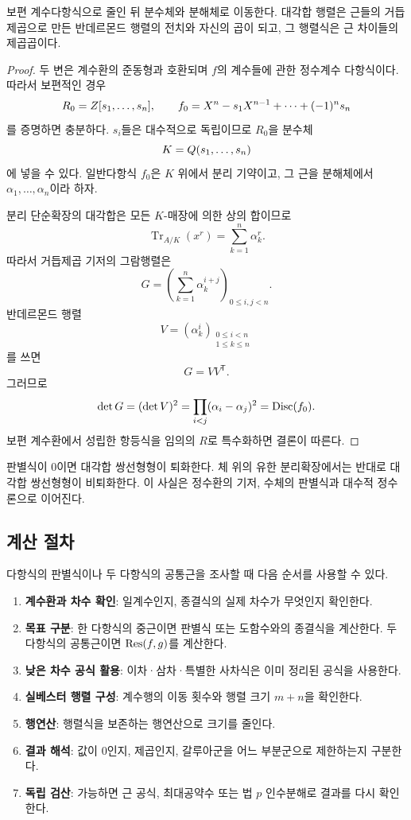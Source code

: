 \begin{proofidea}
보편 계수다항식으로 줄인 뒤 분수체와 분해체로 이동한다. 대각합 행렬은 근들의 거듭제곱으로 만든 반데르몬드 행렬의 전치와 자신의 곱이 되고, 그 행렬식은 근 차이들의 제곱곱이다.
\end{proofidea}

\begin{proof}
두 변은 계수환의 준동형과 호환되며 $f$의 계수들에 관한 정수계수 다항식이다. 따라서 보편적인 경우
\[
  R_0=Z[s_1,\dots,s_n],
  \qquad
  f_0=X^n-s_1X^{n-1}+\cdots+(-1)^ns_n
\]
를 증명하면 충분하다. $s_i$들은 대수적으로 독립이므로 $R_0$을 분수체
\[
  K=Q(s_1,\dots,s_n)
\]
에 넣을 수 있다. 일반다항식 $f_0$은 $K$ 위에서 분리 기약이고, 그 근을 분해체에서 $\alpha_1,\dots,\alpha_n$이라 하자.

분리 단순확장의 대각합은 모든 $K$-매장에 의한 상의 합이므로
\[
  \operatorname{Tr}_{A/K}(x^r)
  =\sum_{k=1}^n\alpha_k^r.
\]
따라서 거듭제곱 기저의 그람행렬은
\[
  G=\left(
  \sum_{k=1}^n\alpha_k^{i+j}
  \right)_{0\le i,j<n}.
\]
반데르몬드 행렬
\[
  V=(\alpha_k^i)_{
  \substack{0\le i<n\\1\le k\le n}}
\]
를 쓰면
\[
  G=VV^{\mathsf T}.
\]
그러므로
\[
  \det G=(\det V)^2
  =\prod_{i<j}(\alpha_i-\alpha_j)^2
  =\operatorname{Disc}(f_0).
\]
보편 계수환에서 성립한 항등식을 임의의 $R$로 특수화하면 결론이 따른다.
\end{proof}

\begin{remark}
판별식이 $0$이면 대각합 쌍선형형이 퇴화한다. 체 위의 유한 분리확장에서는 반대로 대각합 쌍선형형이 비퇴화한다. 이 사실은 정수환의 기저, 수체의 판별식과 대수적 정수론으로 이어진다.
\end{remark}

\subsection{계산 절차}

다항식의 판별식이나 두 다항식의 공통근을 조사할 때 다음 순서를 사용할 수 있다.

\begin{enumerate}
  \item \textbf{계수환과 차수 확인}: 일계수인지, 종결식의 실제 차수가 무엇인지 확인한다.
  \item \textbf{목표 구분}: 한 다항식의 중근이면 판별식 또는 도함수와의 종결식을 계산한다. 두 다항식의 공통근이면 $\operatorname{Res}(f,g)$를 계산한다.
  \item \textbf{낮은 차수 공식 활용}: 이차·삼차·특별한 사차식은 이미 정리된 공식을 사용한다.
  \item \textbf{실베스터 행렬 구성}: 계수행의 이동 횟수와 행렬 크기 $m+n$을 확인한다.
  \item \textbf{행연산}: 행렬식을 보존하는 행연산으로 크기를 줄인다.
  \item \textbf{결과 해석}: 값이 $0$인지, 제곱인지, 갈루아군을 어느 부분군으로 제한하는지 구분한다.
  \item \textbf{독립 검산}: 가능하면 근 공식, 최대공약수 또는 법 $p$ 인수분해로 결과를 다시 확인한다.
\end{enumerate}


